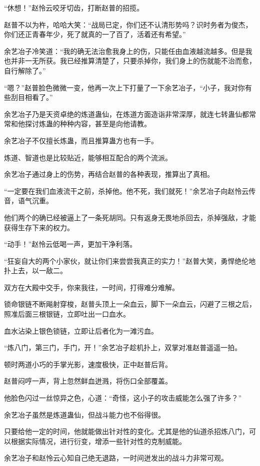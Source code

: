 \begin{this_body}
“休想！”赵怜云咬牙切齿，打断赵普的招揽。

赵普不以为杵，哈哈大笑：“战局已定，你们还不认清形势吗？识时务者为俊杰，你们还正青春年少，死了就真的一了百了，活着还有希望。”

余艺冶子冷笑道：“我的确无法治愈我身上的伤，只能任由血液越流越多。但是我也并非一无所获。我已经推算清楚了，只要杀掉你，我们身上的伤就能不治而愈，自行解除了。”

“嗯？”赵普脸色微微一变，他再一次上下打量了一下余艺冶子，“小子，我对你有些刮目相看了。”

余艺冶子乃是天资卓绝的炼道蛊仙，在炼道方面造诣非常深厚，就连七转蛊仙都常常和他探讨炼蛊的种种内容，甚至是向他请教。

余艺冶子不仅擅长炼蛊，而且推算蛊方也有一手。

炼道、智道也是比较贴近，能够相互配合的两个流派。

余艺冶子通过身上的伤势，再结合赵普的各种表现，推算出了真相。

“一定要在我们血液流干之前，杀掉他。他不死，我们就死！”余艺冶子向赵怜云传音，语气沉重。

他们两个的确已经被逼上了一条死胡同。只有返身无畏地杀回去，杀掉强敌，才能获得生存下来的权力。

“动手！”赵怜云低喝一声，更加干净利落。

“狂妄自大的两个小家伙，就让你们来尝尝我真正的实力！”赵普大笑，勇悍绝伦地扑上去，以一敌二。

双方在大殿中交手，你来我往，一时间，打得难分难解。

锁命银链不断飚射穿梭，赵普头顶上一朵血云，脚下一朵血云，闪避了三根之后，照准后面三根银链，立即吐出一口血水。

血水沾染上银色锁链，立即让后者化为一滩污血。

“炼八门，第三门，手门，开！”余艺冶子趁机扑上，双掌对准赵普遥遥一拍。

顿时两道小巧的手掌光影，速度极快，正中赵普后背。

赵普闷哼一声，背上忽然鲜血迸溅，将伤口全部覆盖。

他脸色闪过一丝惊异之色，心道：“奇怪，这小子的攻击威能怎么强了许多？”

余艺冶子虽然是炼道蛊仙，但战斗能力也不俗得很。

只要给他一定的时间，他就能做出针对性的变化。尤其是他的仙道杀招炼八门，可以根据实际情况，进行衍变，增添一些针对性的克制威能。

余艺冶子和赵怜云心知自己绝无退路，一时间迸发出的战斗力非常可观。

\end{this_body}

